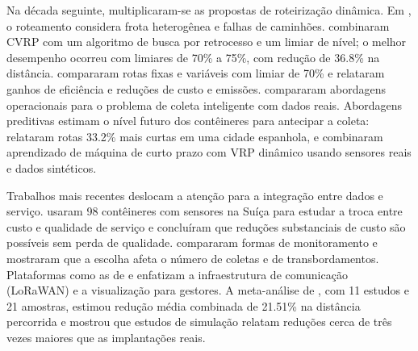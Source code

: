 Na década seguinte, multiplicaram-se as propostas de roteirização dinâmica. Em
\cite{anagnostopoulos2015robust}, o roteamento considera frota heterogênea e
falhas de caminhões. \cite{akhtar2017backtracking} combinaram CVRP com um
algoritmo de busca por retrocesso e um limiar de nível; o melhor desempenho
ocorreu com limiares de 70\% a 75\%, com redução de \num{36,8}\% na distância.
\cite{hannan2020waste} compararam rotas fixas e variáveis com limiar de 70\% e
relataram ganhos de eficiência e reduções de custo e emissões.
\cite{ramos2018smart} compararam abordagens operacionais para o problema de
coleta inteligente com dados reais. Abordagens preditivas estimam o nível
futuro dos contêineres para antecipar a coleta: \cite{ferrer2019bin} relataram
rotas \num{33,2}\% mais curtas em uma cidade espanhola, e \cite{iosif2026optimizing}
combinaram aprendizado de máquina de curto prazo com VRP dinâmico usando
sensores reais e dados sintéticos.

Trabalhos mais recentes deslocam a atenção para a integração entre dados e
serviço. \cite{barth2023data} usaram 98 contêineres com sensores na Suíça para
estudar a troca entre custo e qualidade de serviço e concluíram que reduções
substanciais de custo são possíveis sem perda de qualidade.
\cite{brouwer2023comparison} compararam formas de monitoramento e mostraram que
a escolha afeta o número de coletas e de transbordamentos. Plataformas como as
de \cite{lozano2018smart} e \cite{cardenasleon2024urban} enfatizam a
infraestrutura de comunicação (LoRaWAN) e a visualização para gestores.
A meta-análise de \cite{maciel2025impact}, com 11 estudos e 21 amostras,
estimou redução média combinada de \num{21,51}\% na distância percorrida e
mostrou que estudos de simulação relatam reduções cerca de três vezes maiores
que as implantações reais.


